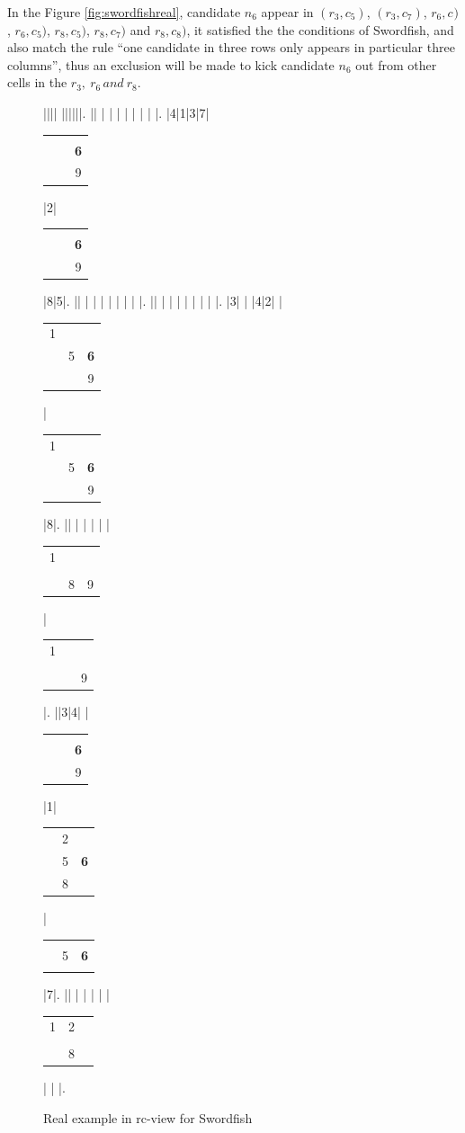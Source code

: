 \documentclass[11pt]{report}
\newcommand{\cell}[9]{%
\scriptsize
\setlength{\tabcolsep}{1pt}
\renewcommand{\arraystretch}{0.5}
\hspace{-0.6em}
\begin{tabular}{ccc}
#1 & #2 & #3\\
#4 & #5 & #6\\
#7 & #8 & #9
\end{tabular}
}
\begin{document}
In the Figure \ref{fig:swordfishreal}, candidate $n_{6}$ appear in $(r_{3}, c_{5})$, $(r_{3}, c_{7})$, $r_{6}, c_{})$, $r_{6}, c_{5})$, $r_{8}, c_{5})$, $r_{8}, c_{7})$ and $r_{8}, c_{8})$, it satisfied the the conditions of Swordfish, and also match the rule ``one candidate in three rows only appears in particular three columns'', thus an exclusion will be made to kick candidate $n_{6}$ out from other cells in the  $r_{3},\ r_{6}\, and\ r_{8}$.

\begin{figure}[htbp]
\begin{sudoku}
 |{}|{}|{}| {}|{}|{}|{}|{}|{}|.
 |{}| | | | | | | | |.
 |{4}|1|3|7|{\cell {}{}{}{}{}{\textbf 6}{}{}9}|2|{\cell {}{}{}{}{}{\textbf 6}{}{}9}|8|5|.
 |{}| | | | | | | | |.
 |{}| | | | | | | | |.
 |{3}| | |4|2| |{\cell 1{}{}{}5{\textbf 6}{}{}9}|{\cell 1{}{}{}5{\textbf 6}{}{}9}|8|.
 |{}| | | | | |{\cell 1{}{}{}{}{\xout 6}{}89}| {\cell 1{}{}{}{}{\xout 6}{}{}9} |.
 |{}|3|4| |{\cell {}{}{}{}{}{\textbf 6}{}{}9}|1|{\cell {}2{}{}5{\textbf 6}{}8{}}|{\cell {}{}{}{}5{\textbf 6}{}{}{}}|7|.
 |{}| | | | | |{\cell 12{}{}{}{\xout 6}{}8{}}| | |.
\end{sudoku}
\caption{Real example in rc-view for Swordfish}
\label{fig:swordfishrealrc}
\end{figure}
\end{document}
